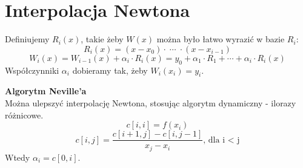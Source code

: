 \section{Interpolacja Newtona}
Definiujemy \( R_i(x) \), takie żeby \( W(x) \) można było łatwo wyrazić w bazie \( R_i \):
\[
	R_i(x) = (x - x_0) \cdot \;\cdots\; \cdot (x - x_{i-1})
\]
\[
	W_i(x) = W_{i-1}(x) + \alpha_i \cdot R_i(x) = y_0 + \alpha_1 \cdot R_1 + \cdots + \alpha_i \cdot R_i(x)
\]
Współczynniki \( \alpha_i \) dobieramy tak, żeby \( W_i(x_i) = y_i \).

\noindent
\textbf{Algorytm Neville'a} \\
Można ulepszyć interpolację Newtona, stosując algorytm dynamiczny - ilorazy różnicowe.
\[
	c[i, i] = f(x_i)
\]
\[
	c[i, j] = \frac{c[i + 1, j] - c[i, j - 1]}{x_j - x_i} \text{, dla i < j}
\]
Wtedy \( \alpha_i = c[0, i] \).